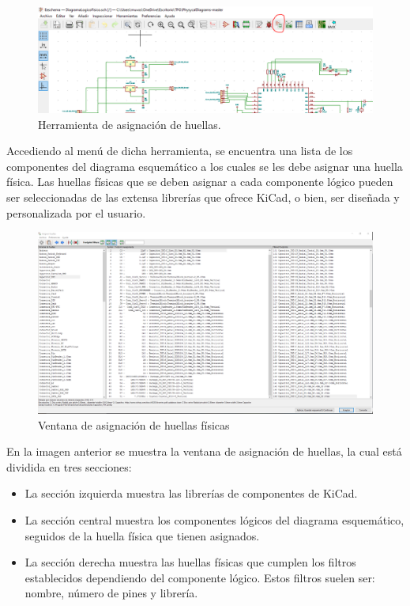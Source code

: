 \begin{figure}[H]
\centering 
\includegraphics[width=\linewidth]{pictures/HerramientaHuellas.PNG}
\caption{Herramienta de asignación de huellas.}
\label{fig:CAMBIAR!!!!!!!!!!}
\end{figure}

Accediendo al menú de dicha herramienta, se encuentra una lista de los componentes del diagrama esquemático a los cuales se les debe asignar una huella física. Las huellas físicas que se deben asignar a cada componente lógico pueden ser seleccionadas de las extensa librerías que ofrece KiCad, o bien, ser diseñada y personalizada por el usuario.

\begin{figure}[H]
\centering 
\includegraphics[width=\linewidth]{pictures/AsignarHuellaTriple.PNG}
\caption{Ventana de asignación de huellas físicas}
\label{fig:kdiagram}
\end{figure}

En la imagen anterior se muestra la ventana de asignación de huellas, la cual está dividida en tres secciones:
\begin{itemize}
    \item La sección izquierda muestra las librerías de componentes de KiCad.
    \item La sección central muestra los componentes lógicos del diagrama esquemático, seguidos de la huella física que tienen asignados.
    \item La sección derecha muestra las huellas físicas que cumplen los filtros establecidos dependiendo del componente lógico. Estos filtros suelen ser: nombre, número de pines y librería. 
\end{itemize}

